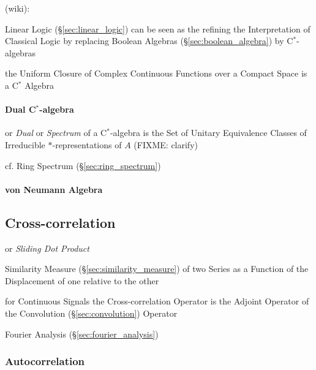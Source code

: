 (wiki):

Linear Logic (\S\ref{sec:linear_logic}) can be seen as the refining
the Interpretation of Classical Logic by replacing Boolean Algebras
(\S\ref{sec:boolean_algebra}) by C$^*$-algebras

the Uniform Closure of Complex Continuous Functions over a Compact Space is a
C$^*$ Algebra



\paragraph{Dual C$^*$-algebra}\label{sec:cstar_dual}\hfill

or \emph{Dual} or \emph{Spectrum} of a C$^*$-algebra is the Set of Unitary
Equivalence Classes of Irreducible $*$-representations of $A$ (FIXME: clarify)

cf. Ring Spectrum (\S\ref{sec:ring_spectrum})



\paragraph{von Neumann Algebra}\label{sec:vonneumann_algebra}\hfill



\subsection{Cross-correlation}\label{sec:cross_correlation}

or \emph{Sliding Dot Product}

Similarity Measure (\S\ref{sec:similarity_measure}) of two Series as a Function
of the Displacement of one relative to the other

for Continuous Signals the Cross-correlation Operator is the Adjoint Operator
of the Convolution (\S\ref{sec:convolution}) Operator

\fist Fourier Analysis (\S\ref{sec:fourier_analysis})



\subsubsection{Autocorrelation}\label{sec:autocorrelation}




